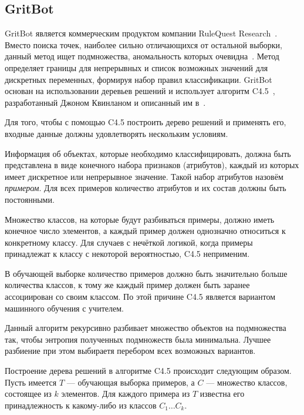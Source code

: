 \subsection{GritBot}
GritBot является коммерческим продуктом компании RuleQuest Research~\cite{GritBotWebPage}. Вместо поиска точек, наиболее сильно отличающихся от остальной выборки, данный метод ищет подмножества, аномальность которых очевидна~\cite{SchwabacherMachLearnAppl}. Метод определяет границы для непрерывных и список возможных значений для дискретных переменных, формируя набор правил классификации. GritBot основан на использовании деревьев решений и использует алгоритм C4.5~\cite{MLInCyberTrust}, разработанный Джоном Квинланом и описанный им в~\cite{QuinlanC45}.

Для того, чтобы с помощью C4.5 построить дерево решений и применять его, входные данные должны удовлетворять нескольким условиям.

Информация об объектах, которые необходимо классифицировать, должна быть представлена в виде конечного набора признаков (атрибутов), каждый из которых имеет дискретное или непрерывное значение. Такой набор атрибутов назовём \textit{примером}. Для всех примеров количество атрибутов и их состав должны быть постоянными.

Множество классов, на которые будут разбиваться примеры, должно иметь конечное число элементов, а каждый пример должен однозначно относиться к конкретному классу. Для случаев с нечёткой логикой, когда примеры принадлежат к классу с некоторой вероятностью, C4.5 неприменим.

В обучающей выборке количество примеров должно быть значительно больше количества классов, к тому же каждый пример должен быть заранее ассоциирован со своим классом. По этой причине C4.5 является вариантом машинного обучения с учителем.

Данный алгоритм рекурсивно разбивает множество объектов на подмножества так, чтобы энтропия полученных подмножеств была минимальна. Лучшее разбиение при этом выбираетя перебором всех возможных вариантов. 

Построение дерева решений в алгоритме C4.5 происходит следующим образом. Пусть имеется $T$ --- обучающая выборка примеров, а $C$ --- множество классов, состоящее из $k$ элементов. Для каждого примера из $T$ известна его принадлежность к какому-либо из классов $C_1\dots C_k$.

